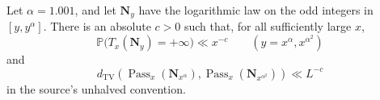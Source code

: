 \begin{theorem}
\label{thm:Tao-v7-Prop111-first-passage}
Let \(\alpha=1.001\), and let \(\mathbf N_y\) have the logarithmic law on
the odd integers in \([y,y^\alpha]\).  There is an absolute \(c>0\) such
that, for all sufficiently large \(x\),
\begin{equation}
\label{eq:Tao-Prop111-theorem-failure}
 \mathbb P\bigl(T_x(\mathbf N_y)=+\infty\bigr)\ll x^{-c}
 \qquad (y=x^\alpha,x^{\alpha^2})
\end{equation}
and
\begin{equation}
\label{eq:Tao-Prop111-theorem-TV}
 d_{\mathrm{TV}}\!\left(
  \operatorname{Pass}_x(\mathbf N_{x^\alpha}),
  \operatorname{Pass}_x(\mathbf N_{x^{\alpha^2}})
 \right)\ll L^{-c}
\end{equation}
in the source's unhalved convention.
\end{theorem}


